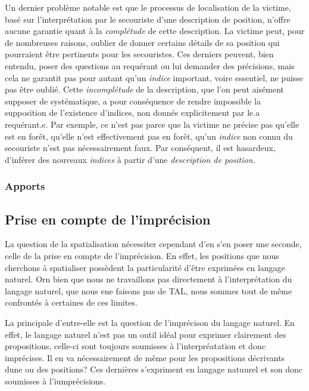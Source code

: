Un dernier problème notable est que le processus de localisation de la
victime, basé sur l'interprétation par le secouriste d'une description
de position, n'offre aucune garantie quant à la \emph{complétude} de
cette description. La victime peut, pour de nombreuses raisons,
oublier de donner certains détails de sa position qui pourraient être
pertinents pour les secouristes. Ces derniers peuvent, bien entendu,
poser des questions au requérant ou lui demander des précisions, mais
cela ne garantit pas pour autant qu'un \emph{indice} important, voire
essentiel, ne puisse pas être oublié. Cette \emph{incomplétude} de la
description, que l'on peut aisément supposer de systématique, a pour
conséquence de rendre impossible la supposition de l’existence
d'indices, non donnés explicitement par le.a requérant.e. Par exemple,
ce n'est pas parce que la victime ne précise pas qu'elle est en forêt,
qu'elle n'est effectivement pas en forêt, \ie qu'un \emph{indice} non
connu du secouriste n'est pas nécessairement faux. Par conséquent, il
est hasardeux, d'inférer des nouveaux \emph{indices} à partir d'une
\emph{description de position.} 

\subsubsection{Apports}

\subsection{Prise en compte de l'imprécision}
\label{subsec:2-1-2}

La question de la spatialisation nécessiter cependant d'en s'en poser
une seconde, celle de la prise en compte de l'imprécision. En effet,
les positions que nous cherchons à spatialiser possèdent la
particularité d'être exprimées en langage naturel. Orn bien que nous
ne travaillons pas directement à l'interprétation du langage naturel,
\ie que nous ene faisons pas de TAL, nous sommes tout de même
confrontés à certaines de ces limites.

La principale d'entre-elle est la question de l'imprécison du langage
naturel. En effet, le langage naturel n'est pas un outil idéal pour
exprimer clairement des propositions, celle-ci sont toujours
soumisses à l'interpréatation et donc imprécises. Il en va
nécessairement de même pour les propositions décrivants dune ou des
positions? Ces dernières s'expriment en langage natuurel et son donc
soumisses à l'iumprécisions.

